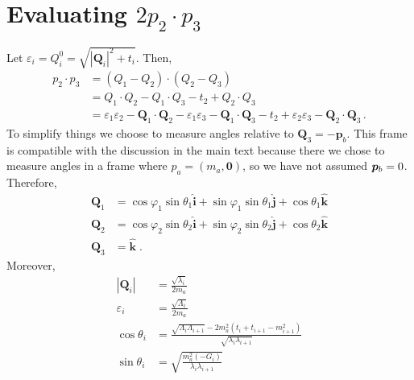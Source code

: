 \newcommand*{\sintheta}[2]{
    \sqrt{\frac{m_a^2 (-G_{#1})}{\lambda_{#1} \lambda_{#2}}}
}
\newcommand*{\costheta}[2]{
    \frac{\sqrt{\Lambda_{#1} \Lambda_{#2}} - 2 m_a^2 (t_{#1} + t_{#2} - m_{#2}^2)}{\sqrt{\lambda_{#1}\lambda_{#2}}}
}

\section{Evaluating $2 p_2 \cdot p_3$}
\newcommand{\Qvec}[1]{\bm{Q}_{#1}}
\newcommand{\Qmag}[1]{|\bm{Q}_{#1}|}
\label{app:2-dot-3}
Let $\varepsilon_i = Q_i^0 = \sqrt{\Qmag{i}^2 + t_i}$. Then,
\begin{equation}
    \begin{aligned}
        p_2 \cdot p_3 
        &=
            (Q_1 - Q_2)\cdot(Q_2 - Q_3)     \\
        &=
            Q_1 \cdot Q_2 - Q_1 \cdot Q_3 - t_2 + Q_2 \cdot Q_3 \\
        &= 
            \varepsilon_1 \varepsilon_2 - \Qvec{1}\cdot\Qvec{2}
        -
            \varepsilon_1 \varepsilon_3 - \Qvec{1}\cdot\Qvec{3}
        -
            t_2
        +
        \varepsilon_2 \varepsilon_3 - \Qvec{2}\cdot\Qvec{3} \, . 
    \end{aligned}
\end{equation}
To simplify things we choose to measure angles relative to $\Qvec{3} = -\bm{p}_b$. This frame is compatible with the discussion in the main text because there we chose to measure angles in a frame where $p_a = (m_a, \bm{0})$, so we have not assumed $\pvec[b] = 0$. Therefore, 
\begin{align}
    \Qvec{1} &= \cos \varphi_1 \sin \theta_1 \hat{\bm{i}} + \sin \varphi_1 \sin \theta_1 \hat{\bm{j}} + \cos \theta_1 \hat{\bm{k}} \\
    \Qvec{2} &= \cos \varphi_2 \sin \theta_2 \hat{\bm{i}} + \sin \varphi_2 \sin \theta_2 \hat{\bm{j}} + \cos \theta_2 \hat{\bm{k}} \\
    \Qvec{3} &= \hat{\bm{k}} \; .
\end{align}
Moreover, 
\begin{align}
    \Qmag{i} &= \frac{\sqrt{\lambda_i}}{2 m_a} \\
    \varepsilon_i &= \frac{\sqrt{\Lambda_i}}{2 m_a} \\
    \cos \theta_i &= \frac{\sqrt{\Lambda_i \Lambda_{i+1}} - 2 m_a^2 (t_i + t_{i+1} - m_{i+1}^2)}{\sqrt{\lambda_i \lambda_{i+1}}} \\
    \sin\theta_i &= \sintheta{i}{i+1}
\end{align}
